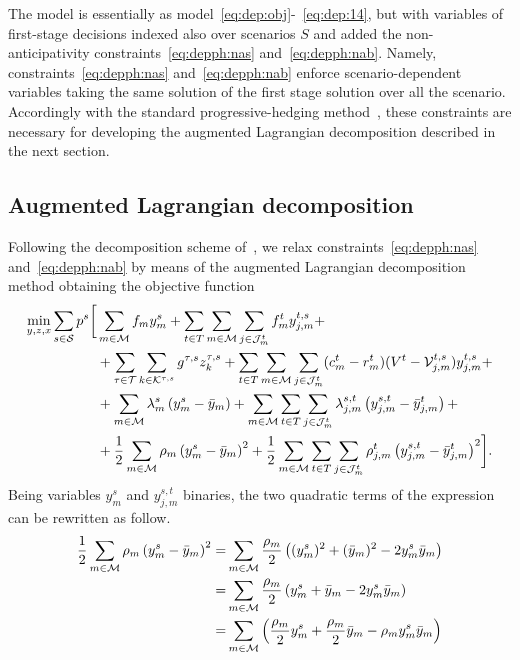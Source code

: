 \documentclass[a4paper,11pt]{article}
\begin{document}
	The model is essentially as model~\eqref{eq:dep:obj}-~\eqref{eq:dep:14}, but with variables of first-stage decisions indexed also over scenarios $ S$ and added the non-anticipativity constraints~\eqref{eq:depph:nas} and~\eqref{eq:depph:nab}.
	{\color{blue} Namely, constraints~\eqref{eq:depph:nas} and~\eqref{eq:depph:nab} enforce scenario-dependent variables taking the same solution of the first stage solution over all the scenario.
	Accordingly with the standard progressive-hedging method~\cite{rockafellar1991scenarios}, these constraints are necessary for developing the augmented Lagrangian decomposition described in the next section.}
	
	\subsection{Augmented Lagrangian decomposition}
	Following the decomposition scheme of~\cite{rockafellar1991scenarios}, we relax constraints~\eqref{eq:depph:nas} and~\eqref{eq:depph:nab} by means of the augmented Lagrangian decomposition method obtaining the objective function
	\begin{equation}
	\begin{split}
		\min_{y,z,x} \sum_{s \in \cal S} p^{s} \biggl[ & \sum_{m \in \cal M} {f_{m}} y^s_{m} +  \sum_{t \in T} \sum_{m \in {{\cal M}}} \sum_{j \in {\cal J}_{m}^t} f_{m}^t y^{t,s}_{j,m} + \\
		& + \sum_{\tau \in \cal T} \sum_{k \in {\cal K}^{\tau,s}} g^{\tau,s} z_k^{\tau,s} + \sum_{t \in T} \sum_{m \in {\cal M}} \sum_{j \in {\cal J}^t_{m}} (c_{m}^t-r_{m}^t)(V^{t} - {\cal V}_{j,m}^{t,s}) y^{t,s}_{j,m} + \\
		& + \sum\limits_{m \in {\cal M}} \lambda^s_m \left( y^s_m - \bar{y}_m \right) + \sum\limits_{m \in {\cal M}} \sum\limits_{t \in T} \sum\limits_{j \in {\cal J}_{m}^t} \lambda^{s,t}_{j,m} \left( y^{s,t}_{j,m} - \bar{y}^t_{j,m} \right) + \\
		& + \frac{1}{2} \sum\limits_{m \in {\cal M}} \rho_m \left( y^s_m - \bar{y}_m \right)^2 + \frac{1}{2} \sum\limits_{m \in {\cal M}} \sum\limits_{t \in T} \sum\limits_{j \in {\cal J}_{m}^t} \rho^{t}_{j,m} \left( y^{s,t}_{j,m} - \bar{y}^t_{j,m} \right)^2 \biggr]. \label{eq:depphlg:obj}
		\end{split}
	\end{equation}
	{\color{blue} Being variables $ y^s_m$ and $ y^{s,t}_{j,m}$ binaries}, the two quadratic terms of the expression can be rewritten as follow.	
	\begin{equation}
	\begin{split}
		\frac{1}{2} \sum\limits_{m \in {\cal M}} \rho_m \left( y^s_m - \bar{y}_m \right)^2 = & \sum\limits_{m \in {\cal M}} \frac{\rho_m}{2} \left( (y^s_m)^2 +  (\bar{y}_m)^2 - 2 y^s_m \bar{y}_m \right) \\
		= & \sum\limits_{m \in {\cal M}} \frac{\rho_m}{2} \left( y^s_m +  \bar{y}_m - 2 y^s_m \bar{y}_m \right) \\
		= & \sum\limits_{m \in {\cal M}} \left( \frac{\rho_m}{2} y^s_m + \frac{\rho_m}{2} \bar{y}_m - \rho_m  y^s_m \bar{y}_m \right)
		\end{split}
	\end{equation}
\end{document}
